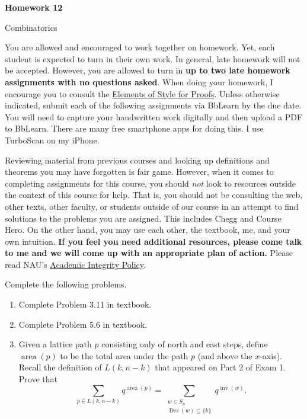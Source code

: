 \documentclass[11pt]{article}%
\theoremstyle{definition}
\DeclareMathOperator{\Des}{Des}
\DeclareMathOperator{\inv}{inv}
\DeclareMathOperator{\area}{area}
\newcommand{\blankline}{\pagebreak[2]\vspace{.5\baselineskip}}
\begin{document}
\begin{center}
{\Large\bf Homework 12}

\smallskip

Combinatorics
\end{center}

\thispagestyle{fancy}

You are allowed and encouraged to work together on homework. Yet, each student is expected to turn in their own work. In general, late homework will not be accepted. However, you are allowed to turn in \textbf{up to two late homework assignments with no questions asked}. When doing your homework, I encourage you to consult the \href{http://danaernst.com/teaching/ElementsOfStyle.pdf}{Elements of Style for Proofs}. Unless otherwise indicated, submit each of the following assignments via BbLearn by the due date. You will need to capture your handwritten work digitally and then upload a PDF to BbLearn. There are many free smartphone apps for doing this. I use TurboScan on my iPhone.

\blankline

Reviewing material from previous courses and looking up definitions and theorems you may have forgotten is fair game. However, when it comes to completing assignments for this course, you should \emph{not} look to resources outside the context of this course for help.  That is, you should not be consulting the web, other texts, other faculty, or students outside of our course in an attempt to find solutions to the problems you are assigned.  This includes Chegg and Course Hero. On the other hand, you may use each other, the textbook, me, and your own intuition. \textbf{If you feel you need additional resources, please come talk to me and we will come up with an appropriate plan of action.} Please read NAU's \href{https://www5.nau.edu/policies/Client/Details/828?whoIsLooking=Students&pertainsTo=All&sortDirection=Ascending&page=1}{Academic Integrity Policy}.

\blankline

Complete the following problems. 
\begin{enumerate}
\item Complete Problem 3.11 in textbook.
\item Complete Problem 5.6 in textbook.
\item Given a lattice path $p$ consisting only of north and east steps, define $\area(p)$ to be the total area under the path $p$ (and above the $x$-axis). Recall the definition of $L(k,n-k)$ that appeared on Part 2 of Exam 1. Prove that
\[
\sum_{p\in L(k,n-k)}q^{\area(p)}=\sum_{\substack{w\in S_n \\ \Des(w)\subseteq \{k\}}} q^{\inv(w)}.
\]
\end{enumerate}
\end{document}
